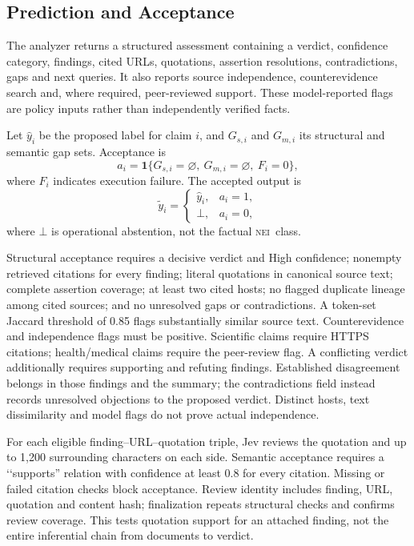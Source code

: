 \documentclass[conference]{IEEEtran}
\newcommand{\NEI}{\textsc{nei}}
\begin{document}
\subsection{Prediction and Acceptance}
The analyzer returns a structured assessment containing a verdict, confidence category, findings, cited URLs, quotations, assertion resolutions, contradictions, gaps and next queries. It also reports source independence, counterevidence search and, where required, peer-reviewed support. These model-reported flags are policy inputs rather than independently verified facts.

Let $\hat y_i$ be the proposed label for claim $i$, and $G_{s,i}$ and $G_{m,i}$ its structural and semantic gap sets. Acceptance is
\begin{equation}
a_i=\mathbf{1}\{G_{s,i}=\varnothing,\ G_{m,i}=\varnothing,\ F_i=0\},
\label{eq:acceptance}
\end{equation}
where $F_i$ indicates execution failure. The accepted output is
\begin{equation}
\tilde y_i =
\begin{cases}
\hat y_i, & a_i=1,\\
\bot, & a_i=0,
\end{cases}
\label{eq:selective}
\end{equation}
where $\bot$ is operational abstention, not the factual \NEI\ class.

Structural acceptance requires a decisive verdict and High confidence; nonempty retrieved citations for every finding; literal quotations in canonical source text; complete assertion coverage; at least two cited hosts; no flagged duplicate lineage among cited sources; and no unresolved gaps or contradictions. A token-set Jaccard threshold of 0.85 flags substantially similar source text. Counterevidence and independence flags must be positive. Scientific claims require HTTPS citations; health/medical claims require the peer-review flag. A conflicting verdict additionally requires supporting and refuting findings. Established disagreement belongs in those findings and the summary; the contradictions field instead records unresolved objections to the proposed verdict. Distinct hosts, text dissimilarity and model flags do not prove actual independence.

For each eligible finding--URL--quotation triple, Jev reviews the quotation and up to 1,200 surrounding characters on each side. Semantic acceptance requires a \lq\lq supports'' relation with confidence at least 0.8 for every citation. Missing or failed citation checks block acceptance. Review identity includes finding, URL, quotation and content hash; finalization repeats structural checks and confirms review coverage. This tests quotation support for an attached finding, not the entire inferential chain from documents to verdict.
\end{document}
